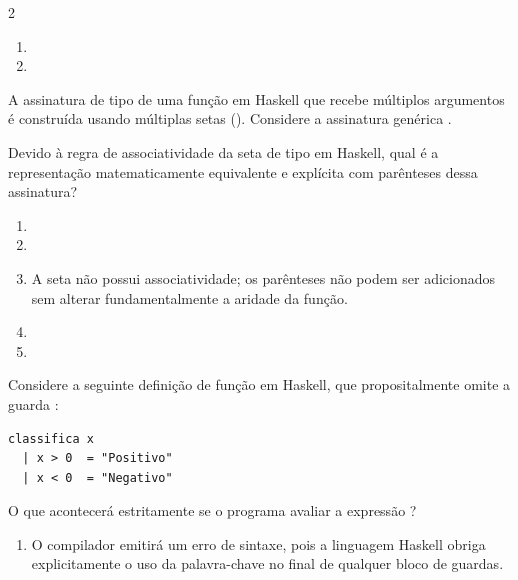 \documentclass[a4paper,10pt,brazil]{article}
\begin{document}
\begin{multicols}{2}
\begin{enumerate}
  \item {}

  \item {}


\end{enumerate}

A assinatura de tipo de uma função em Haskell que recebe múltiplos argumentos é construída usando múltiplas setas (\haskellinline{->}). Considere a assinatura genérica . 

Devido à regra de associatividade da seta de tipo em Haskell, qual é a representação matematicamente equivalente e explícita com parênteses dessa assinatura?

\begin{enumerate}
  \item {}

  \item {}

  \item A seta não possui associatividade; os parênteses não podem ser adicionados sem alterar fundamentalmente a aridade da função.

  \item {}

  \item {}


\end{enumerate}

Considere a seguinte definição de função em Haskell, que propositalmente omite a guarda :

\begin{verbatim}
classifica x
  | x > 0  = "Positivo"
  | x < 0  = "Negativo"
\end{verbatim}

O que acontecerá estritamente se o programa avaliar a expressão ?

\begin{enumerate}
  \item O compilador emitirá um erro de sintaxe, pois a linguagem Haskell obriga explicitamente o uso da palavra-chave  no final de qualquer bloco de guardas.


\end{enumerate}
\end{multicols}
\end{document}
